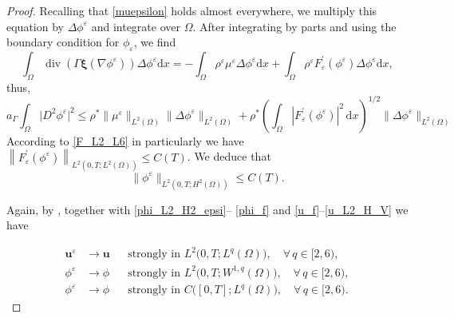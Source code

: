 \documentclass[11pt]{article}
\def\bq{\begin{equation}}
\def\eq{\end{equation}}
\def\bfu{\mathbf{u}}
\def\bfxi{\boldsymbol{\xi}}
\def\md{\mathrm{d}}
\def\bq{\begin{equation}}
\def\eq{\end{equation}}
\def\De{\Delta}
\def\Ga{\Gamma}
\def\na{\nabla}
\def\Om{\Omega}
\def\na{\nabla}
\begin{document}
{\begin{proof}
{Recalling that \eqref{muepsilon} holds almost everywhere, we multiply this equation
by $\Delta \phi^\varepsilon $ and integrate over $\Omega$.
After integrating by parts and using the boundary condition for $\phi_\varepsilon$,
we find
\[
\int_\Om\operatorname{div}\left(\Ga\bfxi(\nabla\phi^{\varepsilon})\right)\De\phi^{\varepsilon} \md x= -\int_\Om\rho^{\varepsilon}\mu^{\varepsilon}\De\phi^{\varepsilon}\md x  + \int_\Om\rho^{\varepsilon} F_{\varepsilon}^{\prime}(\phi^{\varepsilon})\De\phi^{\varepsilon}\md x,
\]
thus,
\[
a_\Ga \int_{\Omega} \lvert D^2 \phi^{\varepsilon} \rvert^2
\le  \rho^* \|\mu^{\varepsilon}\|_{L^2(\Om)}\|\De\phi^{\varepsilon}\|_{L^2(\Om)}+\rho^*\left(\int_\Om |F_{\varepsilon}^{\prime}(\phi^{\varepsilon})|^2\,\md x\right)^{1/2}\|\De \phi^{\varepsilon}\|_{L^2(\Om)}
\]
According to \eqref{F_L2_L6} in particularly we have $\left\|F_{\varepsilon}^{\prime}\left(\phi^{\varepsilon}\right)\right\|_{L^2(0,T;{L^2(\Omega)})} \leq C(T)$.
We deduce that 
\bq
\|\phi^{\varepsilon}\|_{L^2(0,T;H^2(\Om))} \le C(T).\label{phi_L2_H2_epsi}
\eq

Again, by \cite[Lemma 3.1]{giorgini2020weak}, together with \eqref{phi_L2_H2_epsi}-- \eqref{phi_f} and \eqref{u_f}--\eqref{u_L2_H_V} we have 

\begin{align}
\bfu^{\varepsilon} &\to \bfu
&& \text{strongly in } L^2\bigl(0,T; L^q(\Omega)\bigr),
\quad \forall\, q \in [2,6),  \\[0.5em]
\phi^{\varepsilon} &\to \phi
&& \text{strongly in } L^2\bigl(0,T; W^{1,q}(\Omega)\bigr),
\quad \forall\, q \in [2,6), \\[0.5em]
\phi^{\varepsilon} &\to \phi 
&& \text{strongly in } C\bigl([0,T]; L^q(\Omega)\bigr),
\quad \forall\, q \in [2,6).
\end{align}

}
\end{proof}
{ 


}}
\end{document}
